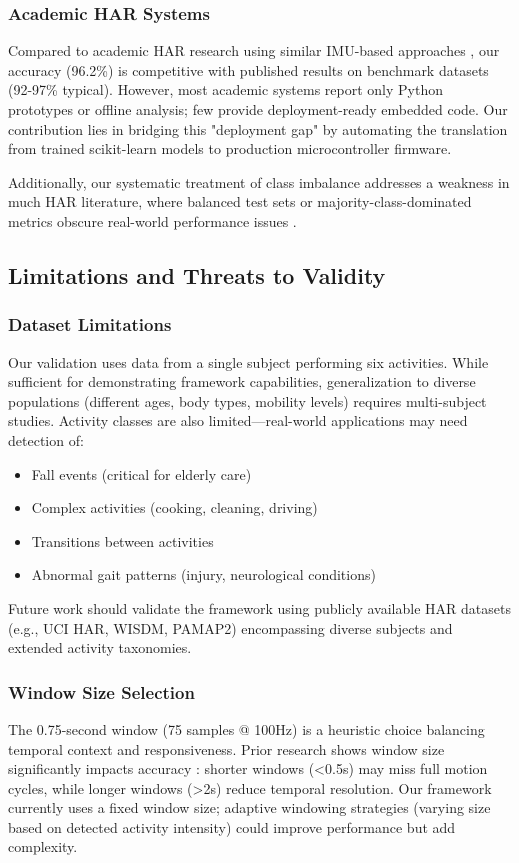 \subsubsection{Academic HAR Systems}
Compared to academic HAR research using similar IMU-based approaches \cite{anguita2013har}, our accuracy (96.2\%) is competitive with published results on benchmark datasets (92-97\% typical). However, most academic systems report only Python prototypes or offline analysis; few provide deployment-ready embedded code. Our contribution lies in bridging this "deployment gap" by automating the translation from trained scikit-learn models to production microcontroller firmware.

Additionally, our systematic treatment of class imbalance addresses a weakness in much HAR literature, where balanced test sets or majority-class-dominated metrics obscure real-world performance issues \cite{he2009learning}.

\subsection{Limitations and Threats to Validity}

\subsubsection{Dataset Limitations}
Our validation uses data from a single subject performing six activities. While sufficient for demonstrating framework capabilities, generalization to diverse populations (different ages, body types, mobility levels) requires multi-subject studies. Activity classes are also limited—real-world applications may need detection of:
\begin{itemize}
    \item Fall events (critical for elderly care)
    \item Complex activities (cooking, cleaning, driving)
    \item Transitions between activities
    \item Abnormal gait patterns (injury, neurological conditions)
\end{itemize}

Future work should validate the framework using publicly available HAR datasets (e.g., UCI HAR, WISDM, PAMAP2) encompassing diverse subjects and extended activity taxonomies.

\subsubsection{Window Size Selection}
The 0.75-second window (75 samples @ 100Hz) is a heuristic choice balancing temporal context and responsiveness. Prior research shows window size significantly impacts accuracy \cite{banos2014wisdm}: shorter windows (<0.5s) may miss full motion cycles, while longer windows (>2s) reduce temporal resolution. Our framework currently uses a fixed window size; adaptive windowing strategies (varying size based on detected activity intensity) could improve performance but add complexity.

